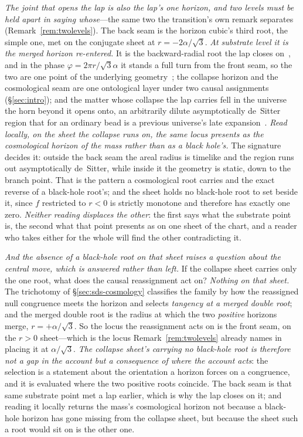 \documentclass[11pt,a4paper]{article}
\theoremstyle{plain}
\theoremstyle{definition}
\theoremstyle{remark}
\begin{document}
\emph{The joint that opens the lap is also the lap's one horizon, and two levels must be held apart in saying
whose}---the same two the transition's own remark separates (Remark~\ref{rem:twolevels}). The back seam is the
horizon cubic's third root, the simple one, met on the conjugate sheet at $r=-2\alpha/\sqrt3$.
\emph{At substrate level it is the merged horizon re-entered.} It is the backward-radial root the lap closes
on~\cite{JanzenSlicing}, and in the phase $\varphi=2\pi r/\sqrt3\alpha$ it stands a full turn from the front
seam, so the two are one point of the underlying geometry~\cite{JanzenCircle}; the collapse horizon and the
cosmological seam are one ontological layer under two causal assignments (\S\ref{sec:intro}); and the matter
whose collapse the lap carries fell in the universe the horn beyond it opens onto, an arbitrarily dilute
asymptotically de~Sitter region that for an ordinary bead is a previous universe's late
expansion~\cite{JanzenCosmogenesis}. \emph{Read locally, on the sheet the collapse runs on, the same locus
presents as the cosmological horizon of the mass rather than as a black hole's.} The signature decides it:
outside the back seam the areal radius is timelike and the region runs out asymptotically de~Sitter, while
inside it the geometry is static, down to the branch point. That is the pattern a cosmological root carries and
the exact reverse of a black-hole root's; and the sheet holds no black-hole root to set beside it, since $f$
restricted to $r<0$ is strictly monotone and therefore has exactly one zero. \emph{Neither reading displaces
the other}: the first says what the substrate point is, the second what that point presents as on one sheet of
the chart, and a reader who takes either for the whole will find the other contradicting it.

\emph{And the absence of a black-hole root on that sheet raises a question about the central move, which is
answered rather than left.} If the collapse sheet carries only the one root, what does the causal reassignment
act on? \emph{Nothing on that sheet.} The trichotomy of \S\ref{sec:sds-cosmology} classifies the family by how
the reassigned null congruence meets the horizon and selects \emph{tangency at a merged double root}; and the
merged double root is the radius at which the two \emph{positive} horizons merge, $r=+\alpha/\sqrt3$. So the
locus the reassignment acts on is the front seam, on the $r>0$ sheet---which is the locus
Remark~\ref{rem:twolevels} already names in placing it at $\alpha/\sqrt3$. \emph{The collapse sheet's carrying
no black-hole root is therefore not a gap in the account but a consequence of where the account acts}: the
selection is a statement about the orientation a horizon forces on a congruence, and it is evaluated where the
two positive roots coincide. The back seam is that same substrate point met a lap earlier, which is why the lap
closes on it; and reading it locally returns the mass's cosmological horizon not because a black-hole horizon
has gone missing from the collapse sheet, but because the sheet such a root would sit on is the other
one.
\end{document}
